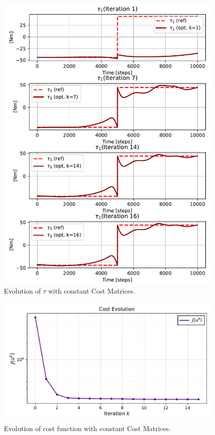 \begin{figure}[htb]
    \centering
    \includegraphics[width=1\linewidth]{img/1-Task1/tau1_const.pdf}
    \caption{Evolution of $\tau$ with constant Cost Matrices.}
    \label{fig:tau_const}
\end{figure}

\clearpage

\begin{figure}[htb]
    \centering
    \includegraphics[width=1\linewidth]{img/1-Task1/J_const.pdf}
    \caption{Evolution of cost function with constant Cost Matrices.}
    \label{fig:J_const}
\end{figure}

